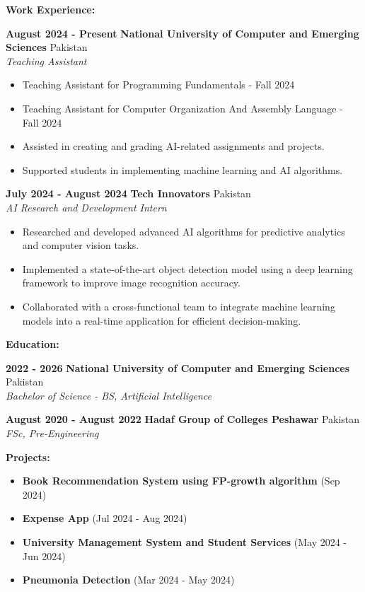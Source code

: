 \documentclass[a4paper,10pt]{article}
\begin{document}
\vspace{10pt}
{\Large \textbf{Work Experience:}} %

\textbf{August 2024 - Present} \hfill \textbf{National University of Computer and Emerging Sciences} \hfill Pakistan\\
\textit{Teaching Assistant}
\begin{itemize}
    \item Teaching Assistant for Programming Fundamentals - Fall 2024
    \item Teaching Assistant for Computer Organization And Assembly Language - Fall 2024
    \item Assisted in creating and grading AI-related assignments and projects.
    \item Supported students in implementing machine learning and AI algorithms.
\end{itemize}

\vspace{5pt}
\textbf{July 2024 - August 2024} \hfill \textbf{Tech Innovators} \hfill Pakistan \\
\textit{AI Research and Development Intern}
\begin{itemize}
    \item Researched and developed advanced AI algorithms for predictive analytics and computer vision tasks.
    \item Implemented a state-of-the-art object detection model using a deep learning framework to improve image recognition accuracy.
    \item Collaborated with a cross-functional team to integrate machine learning models into a real-time application for efficient decision-making.
\end{itemize}
\vspace{10pt}
{\Large \textbf{Education:}} %

\textbf{2022 - 2026} \hfill \textbf{National University of Computer and Emerging Sciences} \hfill Pakistan\\
\textit{Bachelor of Science - BS, Artificial Intelligence}

\textbf{August 2020 - August 2022} \hfill \textbf{Hadaf Group of Colleges Peshawar} \hfill Pakistan\\
\textit{FSc, Pre-Engineering}

\vspace{10pt}
{\Large \textbf{Projects:}} %
\begin{itemize}
    \item \textbf{Book Recommendation System using FP-growth algorithm} (Sep 2024)
    \item \textbf{Expense App} (Jul 2024 - Aug 2024)
    \item \textbf{University Management System and Student Services} (May 2024 - Jun 2024)
    \item \textbf{Pneumonia Detection} (Mar 2024 - May 2024)
\end{itemize}
\end{document}

